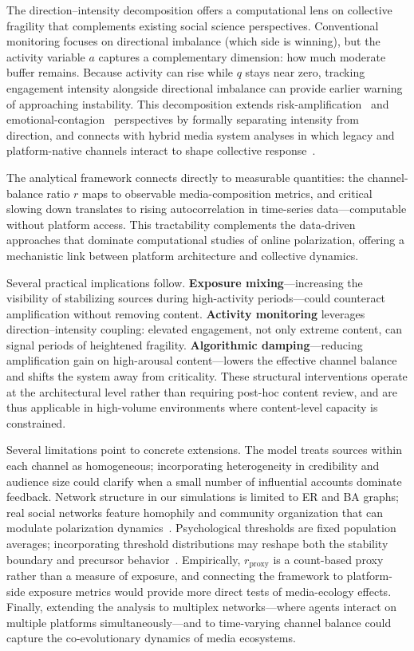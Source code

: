\documentclass[12pt]{article}
\begin{document}
The direction--intensity decomposition offers a computational lens on collective fragility that complements existing social science perspectives. Conventional monitoring focuses on directional imbalance (which side is winning), but the activity variable $a$ captures a complementary dimension: how much moderate buffer remains. Because activity can rise while $q$ stays near zero, tracking engagement intensity alongside directional imbalance can provide earlier warning of approaching instability. This decomposition extends risk-amplification~\cite{Kasperson1988} and emotional-contagion~\cite{Kramer2014,Fan2014,Brady2023} perspectives by formally separating intensity from direction, and connects with hybrid media system analyses in which legacy and platform-native channels interact to shape collective response~\cite{Chadwick2017}.

The analytical framework connects directly to measurable quantities: the channel-balance ratio $r$ maps to observable media-composition metrics, and critical slowing down translates to rising autocorrelation in time-series data---computable without platform access. This tractability complements the data-driven approaches that dominate computational studies of online polarization, offering a mechanistic link between platform architecture and collective dynamics.

Several practical implications follow. \textbf{Exposure mixing}---increasing the visibility of stabilizing sources during high-activity periods---could counteract amplification without removing content. \textbf{Activity monitoring} leverages direction--intensity coupling: elevated engagement, not only extreme content, can signal periods of heightened fragility. \textbf{Algorithmic damping}---reducing amplification gain on high-arousal content---lowers the effective channel balance and shifts the system away from criticality. These structural interventions operate at the architectural level rather than requiring post-hoc content review, and are thus applicable in high-volume environments where content-level capacity is constrained.

Several limitations point to concrete extensions. The model treats sources within each channel as homogeneous; incorporating heterogeneity in credibility and audience size could clarify when a small number of influential accounts dominate feedback. Network structure in our simulations is limited to ER and BA graphs; real social networks feature homophily and community organization that can modulate polarization dynamics~\cite{McPherson2001,Dandekar2013}. Psychological thresholds are fixed population averages; incorporating threshold distributions may reshape both the stability boundary and precursor behavior~\cite{Schwartz2013,Pfefferbaum2020}. Empirically, $r_{\text{proxy}}$ is a count-based proxy rather than a measure of exposure, and connecting the framework to platform-side exposure metrics would provide more direct tests of media-ecology effects. Finally, extending the analysis to multiplex networks---where agents interact on multiple platforms simultaneously---and to time-varying channel balance could capture the co-evolutionary dynamics of media ecosystems.
\end{document}
